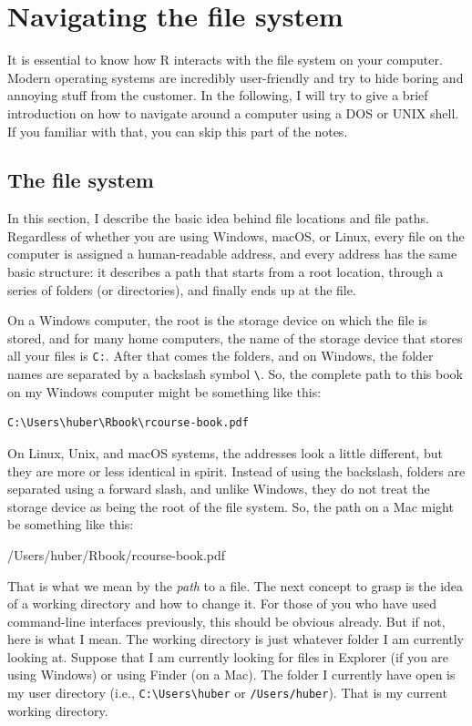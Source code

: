 \documentclass[
  12pt,
  oneside]{book}
\begin{document}
\hypertarget{sec:navigation}{%
\section{Navigating the file system}\label{sec:navigation}}

It is essential to know how R interacts with the file system on your computer. Modern operating systems are incredibly user-friendly and try to hide boring and annoying stuff from the customer. In the following, I will try to give a brief introduction on how to navigate around a computer using a DOS or UNIX shell. If you familiar with that, you can skip this part of the notes.

\hypertarget{sec:filesystem}{%
\subsection{The file system}\label{sec:filesystem}}

In this section, I describe the basic idea behind file locations and file paths. Regardless of whether you are using Windows, macOS, or Linux, every file on the computer is assigned a human-readable address, and every address has the same basic structure: it describes a path that starts from a root location, through a series of folders (or directories), and finally ends up at the file.

On a Windows computer, the root is the storage device on which the file is stored, and for many home computers, the name of the storage device that stores all your files is \texttt{C:}. After that comes the folders, and on Windows, the folder names are separated by a backslash symbol \texttt{\textbackslash{}}. So, the complete path to this book on my Windows computer might be something like this:

\begin{verbatim}
C:\Users\huber\Rbook\rcourse-book.pdf
\end{verbatim}

On Linux, Unix, and macOS systems, the addresses look a little different, but they are more or less identical in spirit. Instead of using the backslash, folders are separated using a forward slash, and unlike Windows, they do not treat the storage device as being the root of the file system. So, the path on a Mac might be something like this:

/Users/huber/Rbook/rcourse-book.pdf

That is what we mean by the \emph{path} to a file. The next concept to grasp is the idea of a working directory and how to change it. For those of you who have used command-line interfaces previously, this should be obvious already. But if not, here is what I mean. The working directory is just whatever folder I am currently looking at. Suppose that I am currently looking for files in Explorer (if you are using Windows) or using Finder (on a Mac). The folder I currently have open is my user directory (i.e., \texttt{C:\textbackslash{}Users\textbackslash{}huber} or \texttt{/Users/huber}). That is my current working directory.
\end{document}
